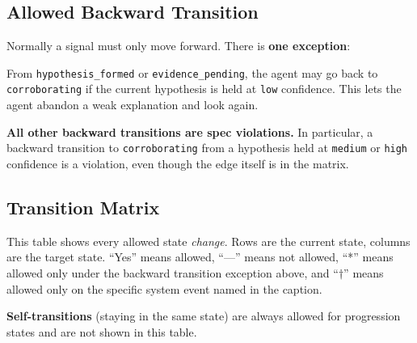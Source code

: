 \documentclass[11pt, a4paper]{article}
\begin{document}
\subsection{Allowed Backward Transition}

Normally a signal must only move forward. There is \textbf{one exception}:

From \texttt{hypothesis\_formed} or \texttt{evidence\_pending}, the agent may go back to \texttt{corroborating} if the current hypothesis is held at \texttt{low} confidence. This lets the agent abandon a weak explanation and look again.

\textbf{All other backward transitions are spec violations.} In particular, a backward transition to \texttt{corroborating} from a hypothesis held at \texttt{medium} or \texttt{high} confidence is a violation, even though the edge itself is in the matrix.

\subsection{Transition Matrix}
\label{sec:matrix}

This table shows every allowed state \textit{change}. Rows are the current state, columns are the target state. ``Yes'' means allowed, ``---'' means not allowed, ``*'' means allowed only under the backward transition exception above, and ``$\dagger$'' means allowed only on the specific system event named in the caption.

\textbf{Self-transitions} (staying in the same state) are always allowed for progression states and are not shown in this table.
\end{document}
